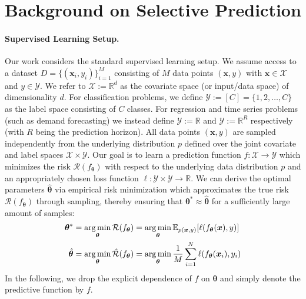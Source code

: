 \section{Background on Selective Prediction}
\label{sec:background}

\paragraph{Supervised Learning Setup.} Our work considers the standard supervised learning setup. We assume access to a dataset $D = \{(\bm{x}_i,y_i)\}_{i=1}^{M}$ consisting of $M$ data points $(\bm{x},y)$ with $\bm{x} \in \mathcal{X}$ and  $y \in \mathcal{Y}$. We refer to $\mathcal{X} := \mathbb{R}^d$ as the covariate space (or input/data space) of dimensionality $d$. For classification problems, we define $\mathcal{Y} := [C] = \{1, 2, \ldots, C\}$ as the label space consisting of $C$ classes. For regression and time series problems (such as demand forecasting) we instead define $\mathcal{Y} := \mathbb{R}$ and $\mathcal{Y} := \mathbb{R}^R$ respectively (with $R$ being the prediction horizon). All data points $(\bm{x},y)$ are sampled independently from the underlying distribution $p$ defined over the joint covariate and label spaces $\mathcal{X} \times \mathcal{Y}$. Our goal is to learn a prediction function $f : \mathcal{X} \rightarrow \mathcal{Y}$ which minimizes the risk $\mathcal{R}(f_{\bm{\theta}})$ with respect to the underlying data distribution $p$ and an appropriately chosen loss function $\ell : \mathcal{Y} \times \mathcal{Y} \rightarrow \mathbb{R}$. 
We can derive the optimal parameters $\hat{\bm{\theta}}$ via empirical risk minimization which approximates the true risk $\mathcal{R}(f_{\bm{\theta}})$ through sampling, thereby ensuring that $\bm{\theta}^* \approx \hat{\bm{\theta}}$ for a sufficiently large amount of samples:
\begin{align}
    \bm{\theta}^* & = \operatorname*{arg\,min}_{\bm{\theta}} \mathcal{R}(f_{\bm{\theta}}) = \operatorname*{arg\,min}_{\bm{\theta}} \mathbb{E}_{p(\bm{x},y)}[\ell(f_{\bm{\theta}}(\bm{x}),y)] \\ 
    \hat{\bm{\theta}} & = \operatorname*{arg\,min}_{\bm{\theta}} \hat{\mathcal{R}}(f_{\bm{\theta}}) = \operatorname*{arg\,min}_{\bm{\theta}} \frac{1}{M} \sum_{i=1}^{N} \ell(f_{\bm{\theta}}(\bm{x}_i),y_i)
\end{align}
In the following, we drop the explicit dependence of $f$ on $\bm{\theta}$ and simply denote the predictive function by $f$.

